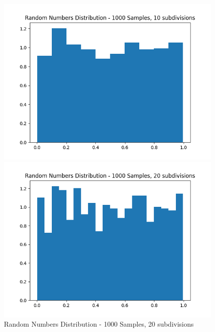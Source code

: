 \documentclass[11pt]{article}
\begin{document}
\begin{figure}[H]
    \centering
    \begin{minipage}{0.48\textwidth}
        \centering
        \includegraphics[width=\textwidth]{Random Numbers Distribution - 1000 Samples, 10 subdivisions.png}
        \caption{Random Numbers Distribution - 1000 Samples, 10 subdivisions}
        \label{fig:1}
    \end{minipage}\hfill
    \begin{minipage}{0.48\textwidth}
        \centering
        \includegraphics[width=\textwidth]{Random Numbers Distribution - 1000 Samples, 20 subdivisions.png}
        \caption{Random Numbers Distribution - 1000 Samples, 20 subdivisions}
        \label{fig:2}
    \end{minipage}
\end{figure}
\end{document}
